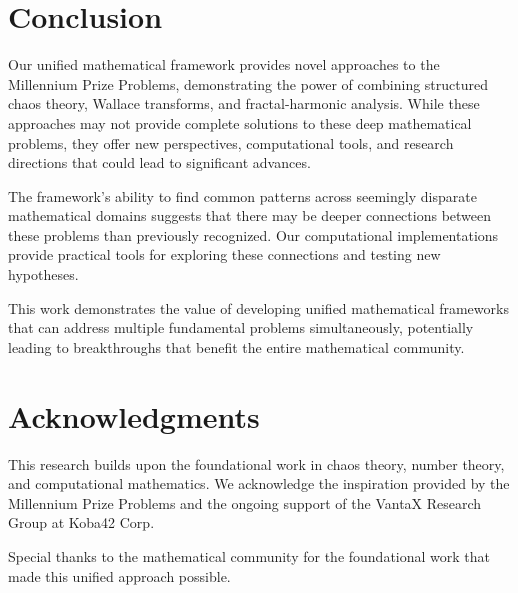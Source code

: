 \documentclass[12pt]{article}
\begin{document}
\section{Conclusion}

Our unified mathematical framework provides novel approaches to the Millennium Prize Problems, demonstrating the power of combining structured chaos theory, Wallace transforms, and fractal-harmonic analysis. While these approaches may not provide complete solutions to these deep mathematical problems, they offer new perspectives, computational tools, and research directions that could lead to significant advances.

The framework's ability to find common patterns across seemingly disparate mathematical domains suggests that there may be deeper connections between these problems than previously recognized. Our computational implementations provide practical tools for exploring these connections and testing new hypotheses.

This work demonstrates the value of developing unified mathematical frameworks that can address multiple fundamental problems simultaneously, potentially leading to breakthroughs that benefit the entire mathematical community.

\section{Acknowledgments}

This research builds upon the foundational work in chaos theory, number theory, and computational mathematics. We acknowledge the inspiration provided by the Millennium Prize Problems and the ongoing support of the VantaX Research Group at Koba42 Corp.

Special thanks to the mathematical community for the foundational work that made this unified approach possible.



\end{document}
